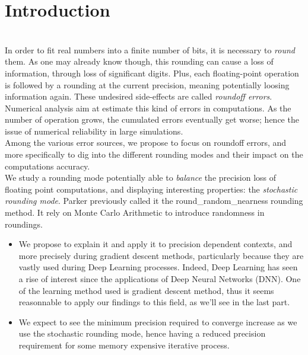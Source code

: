 \documentclass[a4paper,11pt]{article}
\let\cite=\supercite
\begin{document}
\section{Introduction}
\begin{sloppypar} \hspace{0pt} \\
\indent In order to fit real numbers into a finite number of bits, it is necessary to \emph{round} them. As one may already know though, this rounding can cause a loss of information, through loss of significant digits. Plus, each floating-point operation is followed by a rounding at the current precision, meaning potentially loosing information again. These undesired side-effects are called \emph{roundoff errors}\cite{kaneko1973local}. Numerical analysis aim at estimate this kind of errors in computations\cite{Hazewinkel1994}. As the number of operation grows, the cumulated errors eventually get worse; hence the issue of numerical reliability in large simulations. \\
\indent Among the various error sources, we propose to focus on roundoff errors, and more specifically to dig into the different rounding modes and their impact on the computations accuracy.\\
\indent We study a rounding mode potentially able to \emph{balance} the precision loss of floating point computations, and displaying interesting properties: the \emph{stochastic rounding mode}. Parker previously called it the {\ttfamily round\_random\_nearness}\cite{Parker1997} rounding method. It rely on Monte Carlo Arithmetic to introduce randomness in roundings. %
\end{sloppypar}
\begin{itemize}
  \item We propose to explain it and apply it to precision dependent contexts, and more precisely during gradient descent methods, particularly because they are vastly used during Deep Learning processes. Indeed, Deep Learning has seen a rise of interest since the applications of Deep Neural Networks (DNN). One of the learning method used is gradient descent method, thus it seems reasonnable to apply our findings to this field, as we'll see in the last part. %
  \item We expect to see the minimum precision required to converge increase as we use the stochastic rounding mode, hence having a reduced precision requirement for some memory expensive iterative process. %
\end{itemize}
\end{document}
